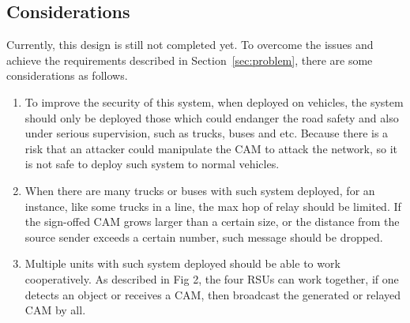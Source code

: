 \subsection{Considerations}

Currently, this design is still not completed yet.
To overcome the issues and achieve the requirements described in Section~\ref{sec:problem}, there are some considerations as follows.

\begin{enumerate}
\item To improve the security of this system,
    when deployed on vehicles,
    the system should only be deployed those which could endanger the road safety and also under serious supervision,
    such as trucks, buses and etc.
    Because there is a risk that an attacker could manipulate the CAM to attack the network,
    so it is not safe to deploy such system to normal vehicles.

\item When there are many trucks or buses with such system deployed,
    for an instance, like some trucks in a line, the max hop of relay should be limited.
    If the sign-offed CAM grows larger than a certain size,
    or the distance from the source sender exceeds a certain number, such message should be dropped.

\item Multiple units with such system deployed should be able to work cooperatively.
    As described in Fig 2, the four RSUs can work together,
    if one detects an object or receives a CAM, then broadcast the generated or relayed CAM by all.
\end{enumerate}